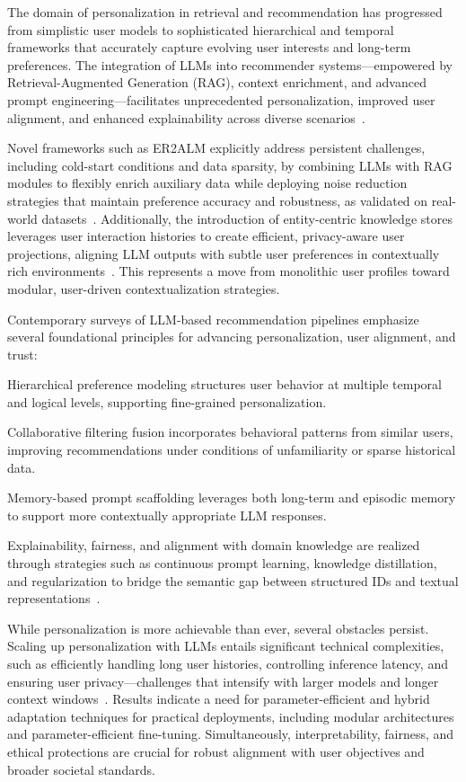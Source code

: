 \documentclass[sigconf]{acmart}
\begin{document}
The domain of personalization in retrieval and recommendation has progressed from simplistic user models to sophisticated hierarchical and temporal frameworks that accurately capture evolving user interests and long-term preferences. The integration of LLMs into recommender systems—empowered by Retrieval-Augmented Generation (RAG), context enrichment, and advanced prompt engineering—facilitates unprecedented personalization, improved user alignment, and enhanced explainability across diverse scenarios~\cite{ref3, ref4, ref5, ref11, ref13, ref19, ref21, ref23, ref24, ref30, ref32, ref33, ref34, ref36, ref39, ref52, ref55, ref61}.

Novel frameworks such as ER2ALM explicitly address persistent challenges, including cold-start conditions and data sparsity, by combining LLMs with RAG modules to flexibly enrich auxiliary data while deploying noise reduction strategies that maintain preference accuracy and robustness, as validated on real-world datasets~\cite{ref11,ref36}. Additionally, the introduction of entity-centric knowledge stores leverages user interaction histories to create efficient, privacy-aware user projections, aligning LLM outputs with subtle user preferences in contextually rich environments~\cite{ref36,ref39}. This represents a move from monolithic user profiles toward modular, user-driven contextualization strategies.

Contemporary surveys of LLM-based recommendation pipelines emphasize several foundational principles for advancing personalization, user alignment, and trust:

Hierarchical preference modeling structures user behavior at multiple temporal and logical levels, supporting fine-grained personalization.

Collaborative filtering fusion incorporates behavioral patterns from similar users, improving recommendations under conditions of unfamiliarity or sparse historical data.

Memory-based prompt scaffolding leverages both long-term and episodic memory to support more contextually appropriate LLM responses.

Explainability, fairness, and alignment with domain knowledge are realized through strategies such as continuous prompt learning, knowledge distillation, and regularization to bridge the semantic gap between structured IDs and textual representations~\cite{ref32,ref33,ref34}.

While personalization is more achievable than ever, several obstacles persist. Scaling up personalization with LLMs entails significant technical complexities, such as efficiently handling long user histories, controlling inference latency, and ensuring user privacy—challenges that intensify with larger models and longer context windows~\cite{ref5,ref24,ref32,ref33,ref55}. Results indicate a need for parameter-efficient and hybrid adaptation techniques for practical deployments, including modular architectures and parameter-efficient fine-tuning. Simultaneously, interpretability, fairness, and ethical protections are crucial for robust alignment with user objectives and broader societal standards.
\end{document}
